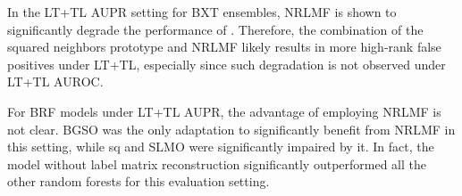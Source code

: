 In the LT+TL AUPR setting for BXT ensembles, NRLMF is shown to significantly degrade the performance of . Therefore, the combination of the squared neighbors prototype and NRLMF likely results in more high-rank false positives under LT+TL, especially since such degradation is not observed under LT+TL AUROC.  %
%



%

For BRF models under LT+TL AUPR, the advantage of employing NRLMF is not clear. BGSO was the only adaptation to significantly benefit from NRLMF in this setting, while sq and SLMO were significantly impaired by it. In fact, the  model without label matrix reconstruction significantly outperformed all the other random forests for this evaluation setting.


